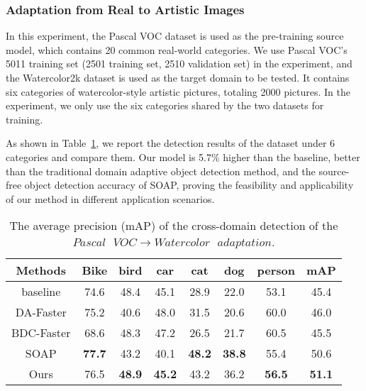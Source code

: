 \documentclass[sn-mathphys]{sn-jnl}%
\theoremstyle{thmstyleone}%
\theoremstyle{thmstyletwo}%
\theoremstyle{thmstylethree}%
\begin{document}
%
%
\subsubsection{Adaptation from Real to Artistic Images}
In this experiment, the Pascal VOC dataset is used as the pre-training source model, which contains 20 common real-world categories. We use Pascal VOC's 5011 training set (2501 training set, 2510 validation set) in the experiment, and the Watercolor2k\cite{inoue2018cross} dataset is used as the target domain to be tested. It contains six categories of watercolor-style artistic pictures, totaling 2000 pictures. In the experiment, we only use the six categories shared by the two datasets for training.

As shown in Table~\ref{table:3}, we report the detection results of the dataset under 6 categories and compare them. Our model is 5.7\% higher than the baseline, better than the traditional domain adaptive object detection method, and the source-free object detection accuracy of SOAP, proving the feasibility and applicability of our method in different application scenarios.

\begin{table}[]
	\begin{center}{	
			\caption{The average precision (mAP) of the cross-domain detection of the $Pascal\text{ }VOC\to Watercolor\text{ }adaptation$.}\label{table:3}
			\begin{tabular}{cccccccc}
				
				\hline
				Methods 	&Bike	&bird	&car	&cat	&dog	&person	  &mAP        \\ \hline		
				baseline   &74.6	&48.4	&45.1	&28.9	&22.0	&53.1	&45.4    \\ \hline		
				DA-Faster\cite{chen2018domain}	&75.2	&40.6	&48.0	&31.5	&20.6	&60.0	&46.0  \\
				BDC-Faster\cite{saito2019strong}	&68.6	&48.3	&47.2	&26.5	&21.7	&60.5	&45.5    \\ \hline
				SOAP\cite{xiong2021source}	&\textbf{77.7}	&43.2	&40.1	&\textbf{48.2}	&\textbf{38.8}	&55.4	&50.6   \\
				Ours	&76.5	&\textbf{48.9}	&\textbf{45.2}	&43.2	&36.2	&\textbf{56.5}	&\textbf{51.1}   \\ \hline
				
		\end{tabular}}	
		
	\end{center}
\end{table}
\end{document}
